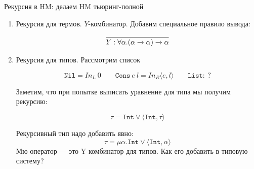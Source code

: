 \documentclass[aspectratio=169]{beamer}
\begin{document}
\begin{frame}{Рекурсия в HM: делаем HM тьюринг-полной}

\begin{enumerate}
\item Рекурсия для термов. $Y$-комбинатор. Добавим специальное правило вывода:

$$\infer{Y : \forall \alpha.(\alpha\rightarrow\alpha)\rightarrow\alpha}{}$$

\item Рекурсия для типов. Рассмотрим список

\vspace{-0.2cm}
$$\texttt{Nil} = In_L\ 0\qquad \texttt{Cons}\ e\ l = In_R \langle e,l \rangle\qquad \texttt{List} :\ ?$$

Заметим, что при попытке выписать уравнение для типа мы получим рекурсию:

\vspace{-0.5cm}
$$\tau = \texttt{Int} \vee \langle \texttt{Int}, \tau \rangle$$

Рекурсивный тип надо добавить явно: $$\tau = \mu \alpha.\texttt{Int}\vee\langle\texttt{Int},\alpha\rangle$$
Мю-оператор --- это Y-комбинатор для типов. Как его добавить в типовую систему?

\end{enumerate}
\end{frame}
\end{document}
